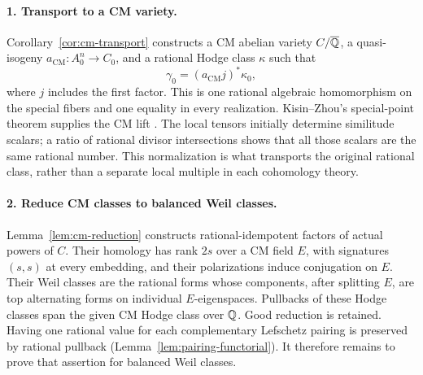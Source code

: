 \paragraph{1. Transport to a CM variety.}
Corollary~\ref{cor:cm-transport} constructs a CM
abelian variety \(C/\overline{\mathbb Q}\), a quasi-isogeny
\(a_{\mathrm{CM}}:A_0^n\to C_0\), and a rational Hodge class
\(\kappa\) such that
\[
 \gamma_0=(a_{\mathrm{CM}}j)^*\kappa_0,
\]
where \(j\) includes the first factor. This is one rational algebraic homomorphism on the
special fibers and one equality in every realization. Kisin--Zhou's
special-point theorem supplies the CM lift
\cite[Theorem~2.2.7]{KisinZhou2025}. The local tensors initially determine
similitude scalars; a ratio of rational divisor intersections shows
that all those scalars are the same rational number. This normalization
is what transports the original rational class, rather than a separate
local multiple in each cohomology theory.

\paragraph{2. Reduce CM classes to balanced Weil classes.}
Lemma~\ref{lem:cm-reduction} constructs rational-idempotent factors of
actual powers of \(C\). Their homology has rank \(2s\) over a CM field
\(E\), with signatures \((s,s)\) at every embedding, and their
polarizations induce conjugation on \(E\). Their Weil classes are the
rational forms whose components, after splitting \(E\), are top
alternating forms on individual \(E\)-eigenspaces. Pullbacks of these
Hodge classes span the given CM Hodge class over \(\mathbb Q\). Good reduction
is retained. Having one rational value for each complementary
Lefschetz pairing is preserved by rational pullback
(Lemma~\ref{lem:pairing-functorial}). It therefore remains to prove
that assertion for balanced Weil classes.

